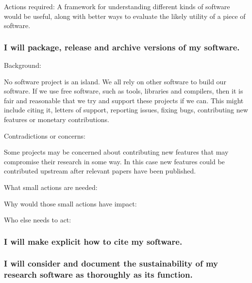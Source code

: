 \documentclass[a4paper,UKenglish]{dagman}
\renewcommand{\paragraph}[1]{\subsubsection*{#1}\xspace}
\begin{document}
Actions required: A framework for understanding different kinds of software would be useful, along with better ways to evaluate the likely utility of a piece of software. 


\paragraph{I will package, release and archive versions of my software.}




Background:

No software project is an island. We all rely on other software to build our software. If we use free software, such as tools, libraries and compilers, then it is fair and reasonable that we try and support these projects if we can. This might include citing it, letters of support, reporting issues, fixing bugs, contributing new features or monetary contributions.

Contradictions or concerns:

Some projects may be concerned about contributing new features that may compromise their research in some way. In this case new features could be contributed upstream after relevant papers have been published.

What small actions are needed:



Why would those small actions have impact:



Who else needs to act:




\paragraph{I will make explicit how to cite my software.}


\paragraph{I will consider and document the sustainability of my research software as thoroughly as its function.}


\end{document}
